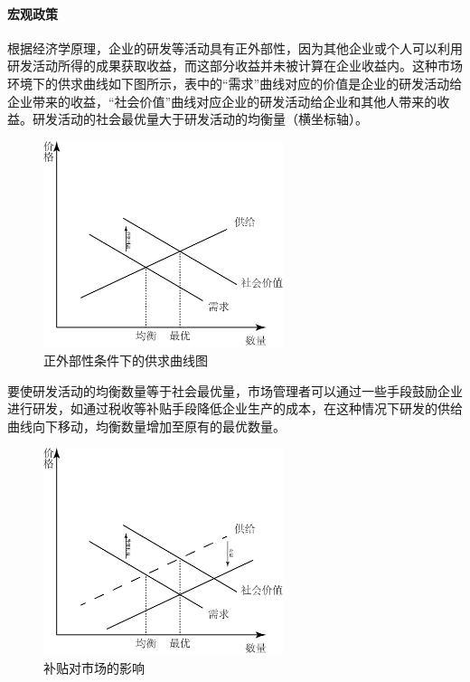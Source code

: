 \documentclass{apa6}
\begin{document}
			\paragraph{宏观政策}
			
			根据经济学原理，企业的研发等活动具有正外部性，因为其他企业或个人可以利用研发活动所得的成果获取收益，而这部分收益并未被计算在企业收益内。这种市场环境下的供求曲线如下图所示，表中的“需求”曲线对应的价值是企业的研发活动给企业带来的收益，“社会价值”曲线对应企业的研发活动给企业和其他人带来的收益。研发活动的社会最优量大于研发活动的均衡量（横坐标轴）\citep{RN29}。
			\begin{figure}[ht]
				\centering
				\includegraphics[width=7cm]{fig5.png} %
				\caption{正外部性条件下的供求曲线图}
				\label{fig:fig5}
			\end{figure}
			
			要使研发活动的均衡数量等于社会最优量，市场管理者可以通过一些手段鼓励企业进行研发，如通过税收等补贴手段降低企业生产的成本，在这种情况下研发的供给曲线向下移动，均衡数量增加至原有的最优数量\citep{RN14}。
			
			\begin{figure}[ht]
				\centering
				\includegraphics[width=7cm]{fig6.png} %
				\caption{补贴对市场的影响}
				\label{fig:fig6}
			\end{figure}
			
\end{document}
